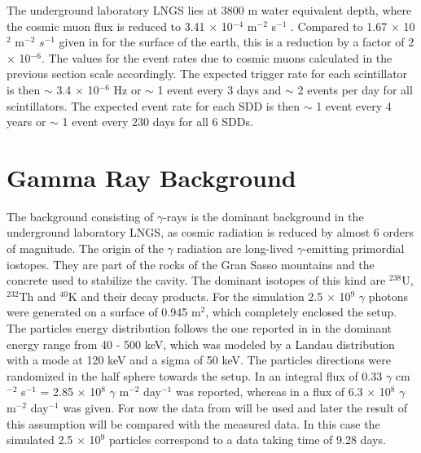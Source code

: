 The underground laboratory LNGS lies at 3800 m water equivalent depth, where the cosmic muon flux is reduced to 3.41 $\times$ 10$^{-4}$ m$^{-2}$ s$^{-1}$ \cite{Bellini2013}. Compared to 1.67 $\times$ 10$^{2}$ m$^{-2}$ $s^{-1}$ given in \cite{Gaisser2000} for the surface of the earth, this is a reduction by a factor of 2 $\times$ 10$^{-6}$. The values for the event rates due to cosmic muons calculated in the previous section scale accordingly. The expected trigger rate for each scintillator is then $\sim$ 3.4 $\times$ 10$^{-6}$ Hz or $\sim$ 1 event every 3 days and $\sim$ 2 events per day for all scintillators. The expected event rate for each SDD is then $\sim$ 1 event every 4 years or $\sim$ 1 event every 230 days for all 6 SDDs.


\section{Gamma Ray Background}

The background consisting of $\gamma$-rays is the dominant background in the underground laboratory LNGS, as cosmic radiation is reduced by almost 6 orders of magnitude. The origin of the $\gamma$ radiation are long-lived $\gamma$-emitting primordial iostopes. They are part of the rocks of the Gran Sasso mountains and the concrete used to stabilize the cavity. The dominant isotopes of this kind are $^{238}$U, $^{232}$Th and $^{40}$K \cite{Haffke2011} and their decay products. For the simulation 2.5 $\times$ 10$^{9}$ $\gamma$ photons were generated on a surface of 0.945 m$^{2}$, which completely enclosed the setup. The particles energy distribution follows the one reported in \cite{Haffke2011} in the dominant energy range from 40 - 500 keV, which was modeled by a Landau distribution with a mode at 120 keV and a sigma of 50 keV. The particles directions were randomized in the half sphere towards the setup. In \cite{Haffke2011} an integral flux of 0.33 $\gamma$ cm$^{-2}$ s$^{-1}$ = 2.85 $\times$ 10$^{8}$ $\gamma$ m$^{-2}$ day$^{-1}$ was reported, whereas in \cite{Bucci2009} a flux of 6.3 $\times$ 10$^{8}$ $\gamma$ m$^{-2}$ day$^{-1}$ was given. For now the data from \cite{Haffke2011} will be used and later the result of this assumption will be compared with the measured data. In this case the simulated 2.5 $\times$ 10$^{9}$ particles correspond to a data taking time of 9.28 days.

